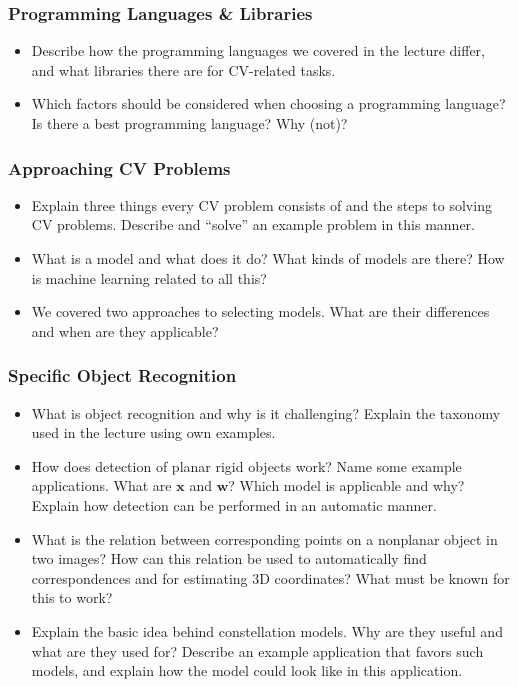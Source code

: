 \documentclass[paper=A4,11pt]{scrartcl}
\renewcommand{\vec}[1]{\ensuremath{\mathbf{#1}}}
\newcommand{\vx}{\vec{x}}
\newcommand{\vw}{\vec{w}}
\begin{document}
\subsubsection*{Programming Languages \& Libraries} %

\begin{itemize}
    \item Describe how the programming languages we covered in the lecture differ, and what libraries there are for CV-related tasks.
    \item Which factors should be considered when choosing a programming language? Is there a best programming language? Why (not)?
\end{itemize}

\subsubsection*{Approaching CV Problems} %

\begin{itemize}
    \item Explain three things every CV problem consists of and the steps to solving CV problems. Describe and \enquote{solve} an example problem in this manner.
    \item What is a model and what does it do? What kinds of models are there? How is machine learning related to all this?
    \item We covered two approaches to selecting models. What are their differences and when are they applicable?
\end{itemize}

\subsubsection*{Specific Object Recognition} %

\begin{itemize}
    \item What is object recognition and why is it challenging? Explain the taxonomy used in the lecture using own examples.
\end{itemize}

\begin{itemize}
    \item How does detection of planar rigid objects work? Name some example applications. What are $\vx$ and $\vw$? Which model is applicable and why? Explain how detection can be performed in an automatic manner.
    \item What is the relation between corresponding points on a nonplanar object in two images? How can this relation be used to automatically find correspondences and for estimating 3D coordinates? What must be known for this to work?
    \item Explain the basic idea behind constellation models. Why are they useful and what are they used for? Describe an example application that favors such models, and explain how the model could look like in this application.
\end{itemize}
\end{document}

